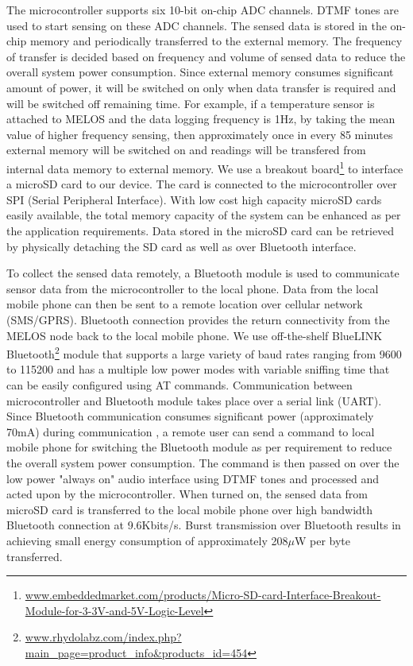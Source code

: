\documentclass[10pt]{sigplan-proc-varsize}
\newcommand{\melos}{MELOS }
\begin{document}
The microcontroller supports six 10-bit on-chip ADC channels. DTMF tones are used to start sensing on these ADC channels. The sensed data is stored in the on-chip memory and periodically transferred to the external memory. The frequency of transfer is decided based on frequency and volume of sensed data to reduce the overall system power consumption. Since external memory consumes significant amount of power, it will be switched on only when data transfer is required and will be switched off remaining time. For example, if a temperature sensor is attached to \melos and the data logging frequency is 1Hz, by taking the mean value of higher frequency sensing, then approximately once in every 85 minutes external memory will be switched on and readings will be transfered from internal data memory to external memory.  We use a breakout board\footnote{{\small\url{www.embeddedmarket.com/products/Micro-SD-card-Interface-Breakout-Module-for-3-3V-and-5V-Logic-Level}}} to interface a microSD card to our device. The card is connected to the microcontroller over SPI (Serial Peripheral Interface). With low cost high capacity microSD cards easily available, the total memory capacity of the system can be enhanced as per the application requirements. Data stored in the microSD card can be retrieved by physically detaching the SD card as well as over Bluetooth interface. 

To collect the sensed data remotely, a Bluetooth module is used to communicate sensor data from the microcontroller to the local phone. Data from the local mobile phone can then be sent to a remote location over cellular network (SMS/GPRS). Bluetooth connection provides the return connectivity from the \melos node back to the local mobile phone. We use off-the-shelf BlueLINK Bluetooth\footnote{\url{www.rhydolabz.com/index.php?main_page=product_info&products_id=454}} module that supports a large variety of baud rates ranging from 9600 to 115200 and has a multiple low power modes with variable sniffing time that can be easily configured using AT commands. Communication between microcontroller and Bluetooth module takes place over a serial link (UART). Since Bluetooth communication consumes significant power (approximately 70mA) during communication , a remote user can send a command to local mobile phone for switching the Bluetooth module as per requirement to reduce the overall system power consumption. The command is then passed on over the low power "always on" audio interface using DTMF tones and processed and acted upon by the microcontroller. When turned on, the sensed data from microSD card is transferred to the local mobile phone over high bandwidth Bluetooth connection at 9.6Kbits/s. Burst transmission over Bluetooth results in achieving small energy consumption of approximately 208$\mu$W per byte transferred.
\end{document}
